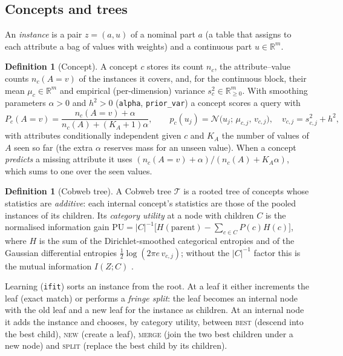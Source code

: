 \documentclass[11pt]{article}
\theoremstyle{definition}
\newtheorem{definition}[theorem]{Definition}
\theoremstyle{remark}
\newcommand{\R}{\mathbb{R}}
\newcommand{\N}{\mathcal{N}}
\newcommand{\T}{\mathcal{T}}
\begin{document}
\subsection{Concepts and trees}

An \emph{instance} is a pair $z=(a,u)$ of a nominal part $a$ (a table that assigns to
each attribute a bag of values with weights) and a continuous part $u\in\R^m$.

\begin{definition}[Concept]\label{def:concept}
A concept $c$ stores its count $n_c$, the attribute--value counts $n_c(A{=}v)$ of the
instances it covers, and, for the continuous block, their mean $\mu_c\in\R^m$ and
empirical (per-dimension) variance $s_c^2\in\R^m_{\ge0}$.  With smoothing parameters
$\alpha>0$ and $h^2>0$ (\texttt{alpha}, \texttt{prior\_var}) a concept scores a query
with
\[
  P_c(A{=}v)=\frac{n_c(A{=}v)+\alpha}{n_c(A)+(K_A+1)\alpha},\qquad
  p_c(u_j)=\N\bigl(u_j;\,\mu_{c,j},\,v_{c,j}\bigr),\quad v_{c,j}=s^2_{c,j}+h^2,
\]
with attributes conditionally independent given $c$ and $K_A$ the number of values of $A$
seen so far (the extra $\alpha$ reserves mass for an unseen value).  When a concept
\emph{predicts} a missing attribute it uses $(n_c(A{=}v)+\alpha)/(n_c(A)+K_A\alpha)$,
which sums to one over the seen values.
\end{definition}

\begin{definition}[Cobweb tree]
A Cobweb tree $\T$ is a rooted tree of concepts whose statistics are \emph{additive}:
each internal concept's statistics are those of the pooled instances of its children.
Its \emph{category utility} at a node with children $C$ is the normalised information
gain $\mathrm{PU}=|C|^{-1}\bigl[H(\text{parent})-\sum_{c\in C}P(c)H(c)\bigr]$, where
$H$ is the sum of the Dirichlet-smoothed categorical entropies and of the Gaussian
differential entropies $\tfrac12\log(2\pi e\,v_{c,j})$; without the $|C|^{-1}$ factor
this is the mutual information $I(Z;C)$ \citep{corter1992,maclellan2026rational}.
\end{definition}

Learning (\texttt{ifit}) sorts an instance from the root.  At a leaf it either
increments the leaf (exact match) or performs a \emph{fringe split}: the leaf becomes an
internal node with the old leaf and a new leaf for the instance as children.  At an
internal node it adds the instance and chooses, by category utility, between
\textsc{best} (descend into the best child), \textsc{new} (create a leaf),
\textsc{merge} (join the two best children under a new node) and \textsc{split}
(replace the best child by its children).
\end{document}
